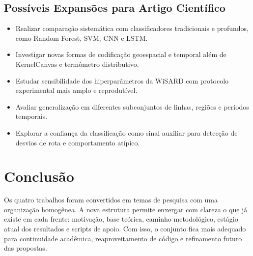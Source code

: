 \documentclass[runningheads]{llncs}
\begin{document}
\subsection{Possíveis Expansões para Artigo Científico}
\begin{itemize}[leftmargin=*]
\item Realizar comparação sistemática com classificadores tradicionais e profundos, como Random Forest, SVM, CNN e LSTM.
\item Investigar novas formas de codificação geoespacial e temporal além de KernelCanvas e termômetro distributivo.
\item Estudar sensibilidade dos hiperparâmetros da WiSARD com protocolo experimental mais amplo e reprodutível.
\item Avaliar generalização em diferentes subconjuntos de linhas, regiões e períodos temporais.
\item Explorar a confiança da classificação como sinal auxiliar para detecção de desvios de rota e comportamento atípico.
\end{itemize}

\section{Conclusão}
Os quatro trabalhos foram convertidos em temas de pesquisa com uma organização homogênea. A nova estrutura permite enxergar com clareza o que já existe em cada frente: motivação, base teórica, caminho metodológico, estágio atual dos resultados e scripts de apoio. Com isso, o conjunto fica mais adequado para continuidade acadêmica, reaproveitamento de código e refinamento futuro das propostas.
\end{document}
